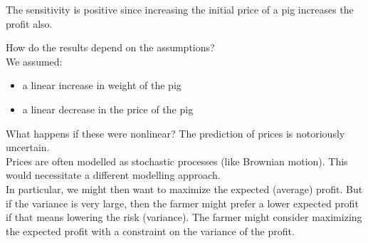\begin{solution}
\begin{slide}
\begin{parts}
	\item The sensitivity is positive since increasing the initial price of a pig increases the profit also.
	
\end{parts}


	
\end{slide}

\end{solution}



\begin{slide}

\begin{definition}[Robustness]
How do the results depend on the assumptions?\\

We assumed:
\begin{itemize}
	\item a linear increase in weight of the pig
	\item a linear decrease in the price of the pig	  \\
\end{itemize}

What happens if these were nonlinear? The prediction of prices is notoriously uncertain. \\

Prices are often modelled as stochastic processes (like Brownian motion). This would necessitate a different modelling approach.  \\

In particular, we might then want to maximize the expected (average) profit. But if the variance is very large, then the farmer might prefer a lower expected profit if that means lowering the risk (variance). 
The farmer might consider maximizing the expected profit with a constraint on the variance of the profit.
\end{definition}

\end{slide}








